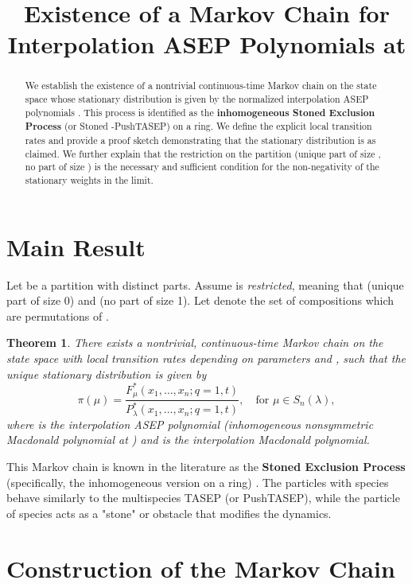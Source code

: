 \documentclass[11pt]{article}
\title{Existence of a Markov Chain for Interpolation ASEP Polynomials at }
\author{}
\date{}
\newtheorem{theorem}{Theorem}
\begin{document}
\maketitle

\begin{abstract}
We establish the existence of a nontrivial continuous-time Markov chain on the state space  whose stationary distribution is given by the normalized interpolation ASEP polynomials . This process is identified as the \textbf{inhomogeneous Stoned Exclusion Process} (or Stoned -PushTASEP) on a ring. We define the explicit local transition rates and provide a proof sketch demonstrating that the stationary distribution is as claimed. We further explain that the restriction on the partition  (unique part of size , no part of size ) is the necessary and sufficient condition for the non-negativity of the stationary weights in the  limit.
\end{abstract}

\section{Main Result}

Let  be a partition with distinct parts. Assume  is \textit{restricted}, meaning that  (unique part of size 0) and  (no part of size 1). Let  denote the set of compositions  which are permutations of .

\begin{theorem}
There exists a nontrivial, continuous-time Markov chain on the state space  with local transition rates depending on parameters  and , such that the unique stationary distribution  is given by
\begin{equation} \label{eq:stationary}
\pi(\mu) = \frac{F^*_{\mu}(x_1,\dots,x_n; q=1,t)}{P^*_{\lambda}(x_1,\dots,x_n; q=1,t)}, \quad \text{for } \mu \in S_n(\lambda),
\end{equation}
where  is the interpolation ASEP polynomial (inhomogeneous nonsymmetric Macdonald polynomial at ) and  is the interpolation Macdonald polynomial.
\end{theorem}

This Markov chain is known in the literature as the \textbf{Stoned Exclusion Process} (specifically, the inhomogeneous version on a ring) \cite{AMW25}. The particles with species  behave similarly to the multispecies TASEP (or PushTASEP), while the particle of species  acts as a "stone" or obstacle that modifies the dynamics.

\section{Construction of the Markov Chain}
\end{document}
